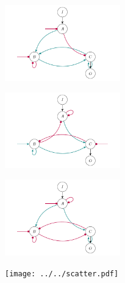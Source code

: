 \documentclass[varwidth=18cm, border=10pt]{standalone}
\begin{document}
\begin{figure}
\begin{subfigure}{6cm}
\caption{}
\end{subfigure}
\begin{subfigure}{6cm}
\centering\includegraphics[width=5cm]{ooomppmpmmppo.pdf}
\caption{}
\end{subfigure}
\begin{subfigure}{6cm}
\centering\includegraphics[width=5cm]{mmoopopmpppom.pdf}
\caption{}
\end{subfigure}
\begin{subfigure}{6cm}
\centering\includegraphics[width=5cm]{moomppmmmpmpo.pdf}
\caption{}
\end{subfigure}
\begin{subfigure}{6cm}
\centering\texttt{[image: ../../scatter.pdf]}
\caption{}
\end{subfigure}
\end{figure}
\end{document}
